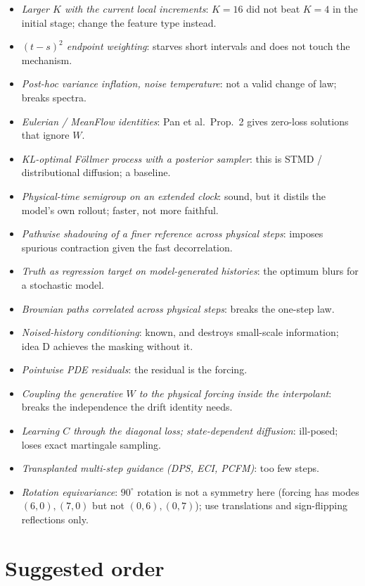 \documentclass[11pt,a4paper]{article}
\begin{document}
\begin{itemize}
\item \emph{Larger $K$ with the current local increments}: $K=16$ did not beat $K=4$ in the initial stage; change the feature type instead.
\item \emph{$(t-s)^2$ endpoint weighting}: starves short intervals and does not touch the mechanism.
\item \emph{Post-hoc variance inflation, noise temperature}: not a valid change of law; breaks spectra.
\item \emph{Eulerian / MeanFlow identities}: Pan et al.\ Prop.~2 gives zero-loss solutions that ignore $W$.
\item \emph{KL-optimal F\"ollmer process with a posterior sampler}: this is STMD / distributional diffusion; a baseline.
\item \emph{Physical-time semigroup on an extended clock}: sound, but it distils the model's own rollout; faster, not more faithful.
\item \emph{Pathwise shadowing of a finer reference across physical steps}: imposes spurious contraction given the fast decorrelation.
\item \emph{Truth as regression target on model-generated histories}: the optimum blurs for a stochastic model.
\item \emph{Brownian paths correlated across physical steps}: breaks the one-step law.
\item \emph{Noised-history conditioning}: known, and destroys small-scale information; idea D achieves the masking without it.
\item \emph{Pointwise PDE residuals}: the residual is the forcing.
\item \emph{Coupling the generative $W$ to the physical forcing inside the interpolant}: breaks the independence the drift identity needs.
\item \emph{Learning $C$ through the diagonal loss; state-dependent diffusion}: ill-posed; loses exact martingale sampling.
\item \emph{Transplanted multi-step guidance (DPS, ECI, PCFM)}: too few steps.
\item \emph{Rotation equivariance}: $90^\circ$ rotation is not a symmetry here (forcing has modes $(6,0),(7,0)$ but not $(0,6),(0,7)$); use translations and sign-flipping reflections only.
\end{itemize}

\section{Suggested order}
\end{document}
